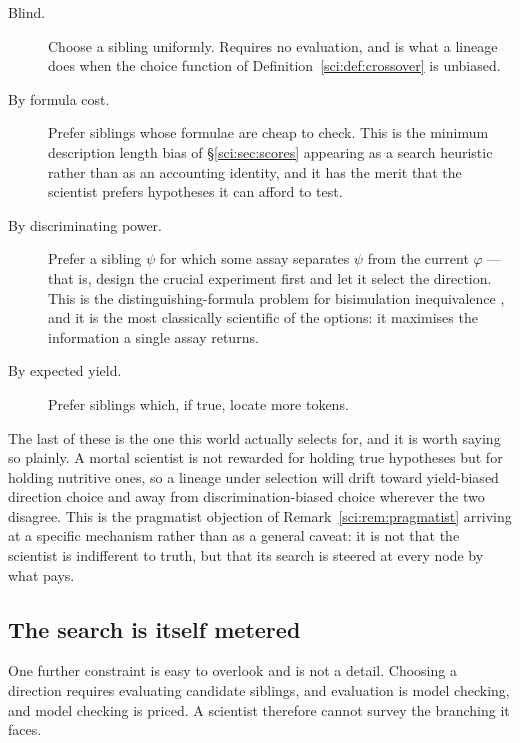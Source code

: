 \begin{description}
\item[Blind.] Choose a sibling uniformly. Requires no evaluation, and is what a lineage does when the
choice function of Definition~\ref{sci:def:crossover} is unbiased.

\item[By formula cost.] Prefer siblings whose formulae are cheap to check. This is the minimum
description length bias of \S\ref{sci:sec:scores} appearing as a search heuristic rather than as an
accounting identity, and it has the merit that the scientist prefers hypotheses it can afford to test.

\item[By discriminating power.] Prefer a sibling $\psi$ for which some assay separates $\psi$ from the
current $\varphi$ --- that is, design the crucial experiment first and let it select the direction.
This is the distinguishing-formula problem for bisimulation inequivalence \cite{Cleaveland}, and it is
the most classically scientific of the options: it maximises the information a single assay returns.

\item[By expected yield.] Prefer siblings which, if true, locate more tokens.
\end{description}

\begin{remark}
\label{sci:rem:yieldbias}
The last of these is the one this world actually selects for, and it is worth saying so plainly. A
mortal scientist is not rewarded for holding true hypotheses but for holding nutritive ones, so a
lineage under selection will drift toward yield-biased direction choice and away from
discrimination-biased choice wherever the two disagree. This is the pragmatist objection of
Remark~\ref{sci:rem:pragmatist} arriving at a specific mechanism rather than as a general caveat: it is not
that the scientist is indifferent to truth, but that its search is steered at every node by what pays.
\end{remark}

\subsection{The search is itself metered}\label{sci:S6.4}

One further constraint is easy to overlook and is not a detail. Choosing a direction requires
evaluating candidate siblings, and evaluation is model checking, and model checking is priced. A
scientist therefore cannot survey the branching it faces.

